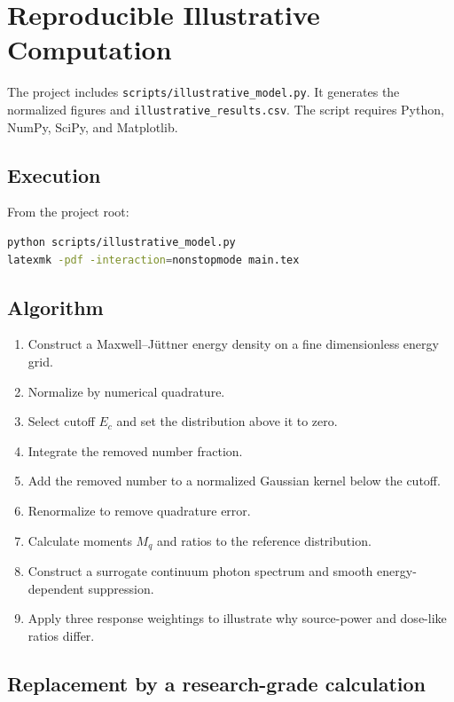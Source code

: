 \chapter{Reproducible Illustrative Computation}
\label{app:computation}

The project includes \texttt{scripts/illustrative\_model.py}. It generates the normalized figures and \texttt{illustrative\_results.csv}. The script requires Python, NumPy, SciPy, and Matplotlib.

\section{Execution}

From the project root:
\begin{lstlisting}[language=bash]
python scripts/illustrative_model.py
latexmk -pdf -interaction=nonstopmode main.tex
\end{lstlisting}

\section{Algorithm}

\begin{enumerate}
\item Construct a Maxwell--J\"uttner energy density on a fine dimensionless energy grid.
\item Normalize by numerical quadrature.
\item Select cutoff $E_c$ and set the distribution above it to zero.
\item Integrate the removed number fraction.
\item Add the removed number to a normalized Gaussian kernel below the cutoff.
\item Renormalize to remove quadrature error.
\item Calculate moments $M_q$ and ratios to the reference distribution.
\item Construct a surrogate continuum photon spectrum and smooth energy-dependent suppression.
\item Apply three response weightings to illustrate why source-power and dose-like ratios differ.
\end{enumerate}

\section{Replacement by a research-grade calculation}

